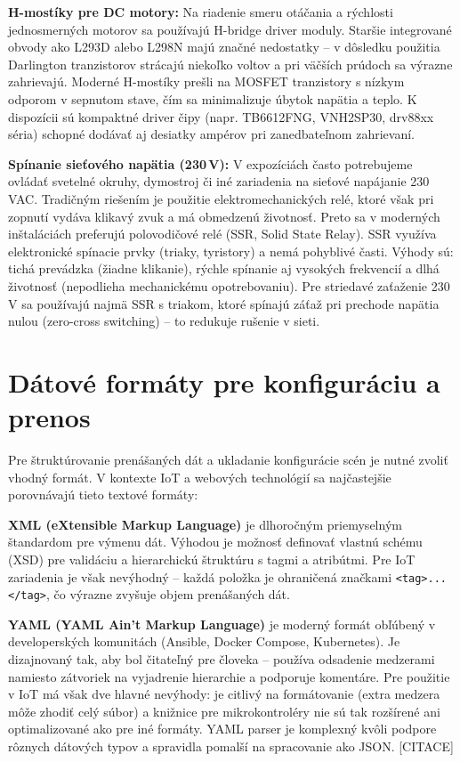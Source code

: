 \textbf{H-mostíky pre DC motory:} Na riadenie smeru otáčania a rýchlosti jednosmerných motorov sa používajú H-bridge driver moduly. Staršie integrované obvody ako L293D alebo L298N majú značné nedostatky -- v dôsledku použitia Darlington tranzistorov strácajú niekoľko voltov a pri väčších prúdoch sa výrazne zahrievajú. Moderné H-mostíky prešli na MOSFET tranzistory s nízkym odporom v sepnutom stave, čím sa minimalizuje úbytok napätia a teplo. K dispozícii sú kompaktné driver čipy (napr. TB6612FNG, VNH2SP30, drv88xx séria) schopné dodávať aj desiatky ampérov pri zanedbateľnom zahrievaní.

\textbf{Spínanie sieťového napätia (230\,V):} V expozíciách často potrebujeme ovládať svetelné okruhy, dymostroj či iné zariadenia na sieťové napájanie 230\,VAC. Tradičným riešením je použitie elektromechanických relé, ktoré však pri zopnutí vydáva klikavý zvuk a má obmedzenú životnosť. Preto sa v moderných inštaláciách preferujú polovodičové relé (SSR, Solid State Relay). SSR využíva elektronické spínacie prvky (triaky, tyristory) a nemá pohyblivé časti. Výhody sú: tichá prevádzka (žiadne klikanie), rýchle spínanie aj vysokých frekvencií a dlhá životnosť (nepodlieha mechanickému opotrebovaniu). Pre striedavé zaťaženie 230\,V sa používajú najmä SSR s triakom, ktoré spínajú záťaž pri prechode napätia nulou (zero-cross switching) -- to redukuje rušenie v sieti.

\section{Dátové formáty pre konfiguráciu a prenos}
\label{datove-formaty}

Pre štruktúrovanie prenášaných dát a ukladanie konfigurácie scén je nutné zvoliť vhodný formát. V kontexte IoT a webových technológií sa najčastejšie porovnávajú tieto textové formáty:

\textbf{XML (eXtensible Markup Language)} je dlhoročným priemyselným štandardom pre výmenu dát. Výhodou je možnosť definovať vlastnú schému (XSD) pre validáciu a hierarchickú štruktúru s tagmi a atribútmi. Pre IoT zariadenia je však nevýhodný -- každá položka je ohraničená značkami \texttt{<tag>...</tag>}, čo výrazne zvyšuje objem prenášaných dát.

\textbf{YAML (YAML Ain't Markup Language)} je moderný formát obľúbený v developerských komunitách (Ansible, Docker Compose, Kubernetes). Je dizajnovaný tak, aby bol čitateľný pre človeka -- používa odsadenie medzerami namiesto zátvoriek na vyjadrenie hierarchie a podporuje komentáre. Pre použitie v IoT má však dve hlavné nevýhody: je citlivý na formátovanie (extra medzera môže zhodiť celý súbor) a knižnice pre mikrokontroléry nie sú tak rozšírené ani optimalizované ako pre iné formáty. YAML parser je komplexný kvôli podpore rôznych dátových typov a spravidla pomalší na spracovanie ako JSON. [CITACE]

